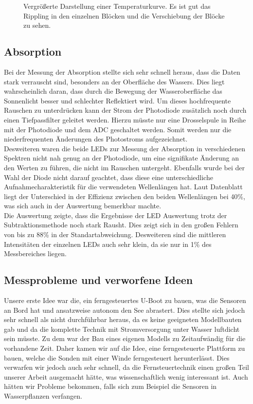 \documentclass[12pt,a4paper,titlepage,headinclude,bibtotoc]{scrartcl}
\numberwithin{equation}{subsection}
\begin{document}
\begin{figure}[h]
	\centering
	
	\caption{Vergrößerte Darstellung einer Temperaturkurve. Es ist gut das Rippling in den einzelnen Blöcken und die Verschiebung der Blöcke zu sehen.}
	\label{fig:tempSprung}
\end{figure}

\subsection{Absorption}
Bei der Messung der Absorption stellte sich sehr schnell heraus, dass die Daten stark verrauscht sind, besonders an der Oberfläche des Wassers.
Dies liegt wahrscheinlich daran, dass durch die Bewegung der Wasseroberfläche das Sonnenlicht besser und schlechter Reflektiert wird.
Um dieses hochfrequente Rauschen zu unterdrücken kann der Strom der Photodiode zusätzlich noch durch einen Tiefpassfilter geleitet werden.
Hierzu müsste nur eine Drosselspule in Reihe mit der Photodiode und dem ADC geschaltet werden.
Somit werden nur die niederfrequenten Änderungen des Photostroms aufgezeichnet.\\
Desweiteren waren die beide LEDs zur Messung der Absorption in verschiedenen Spektren nicht nah genug an der Photodiode, um eine signifikate Änderung an den Werten zu führen, die nicht im Rauschen untergeht.
Ebenfalls wurde bei der Wahl der Diode nicht darauf geachtet, dass diese eine unterschiedliche Aufnahmecharakteristik für die verwendeten Wellenlängen hat.
Laut Datenblatt \cite[20]{PHOTODatenblatt} liegt der Unterschied in der Effizienz zwischen den beiden Wellenlängen bei 40\%, was sich auch in der Auswertung bemerkbar machte.\\
Die Auswertung zeigte, dass die Ergebnisse der LED Auswertung trotz der Subtraktionsmethode noch stark Rausht.
Dies zeigt sich in den großen Fehlern von bis zu 88\% in der Standartabweichung.
Desweiteren sind die mittleren Intensitäten der einzelnen LEDs auch sehr klein, da sie nur in 1\% des Messbereiches liegen.


\subsection{Messprobleme und verworfene Ideen}
Unsere erste Idee war die, ein ferngesteuertes U-Boot zu bauen, was die Sensoren an Bord hat und ansatzweise autonom den See abrastert.
Dies stellte sich jedoch sehr schnell als nicht durchführbar heraus, da es keine geeigneten Modellbauten gab und da die komplette Technik mit Stromversorgung unter Wasser luftdicht sein müsste.
Zu dem war der Bau eines eigenen Modells zu Zeitaufwändig für die vorhandene Zeit.
Daher kamen wir auf die Idee, eine ferngesteuerte Plattform zu bauen, welche die Sonden mit einer Winde ferngesteuert herunterlässt.
Dies verwarfen wir jedoch auch sehr schnell, da die Fernsteuertechnik einen großen Teil unserer Arbeit ausgemacht hätte, was wissenschaftlich wenig interessant ist.
Auch hätten wir Probleme bekommen, falls sich zum Beispiel die Sensoren in Wasserpflanzen verfangen.
\end{document}

